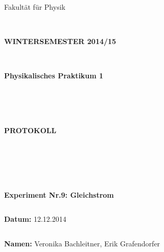\documentclass{article}
\begin{document}
\thispagestyle{empty}
			\begin{center}
			\Large{Fakultät für Physik}\\
			\end{center}
\begin{verbatim}


\end{verbatim}
			\begin{center}
			\textbf{\LARGE WINTERSEMESTER 2014/15}
			\end{center}
\begin{verbatim}


\end{verbatim}
			\begin{center}
			\textbf{\LARGE{Physikalisches Praktikum 1}}
			\end{center}
\begin{verbatim}




\end{verbatim}

			\begin{center}
			\textbf{\LARGE{PROTOKOLL}}
			\end{center}
			
\begin{verbatim}





\end{verbatim}

			\begin{flushleft}
			\textbf{\Large{Experiment Nr.9:} Gleichstrom}\\
			\LARGE{}	
			\end{flushleft}

\begin{verbatim}

\end{verbatim}	
			\begin{flushleft}
			\textbf{\Large{Datum:}} \Large{12.12.2014}
			\end{flushleft}
			
\begin{verbatim}
\end{verbatim}
		\begin{flushleft}
			\textbf{\Large{Namen:}} \Large{Veronika Bachleitner, Erik Grafendorfer}
			\end{flushleft}
\end{document}
